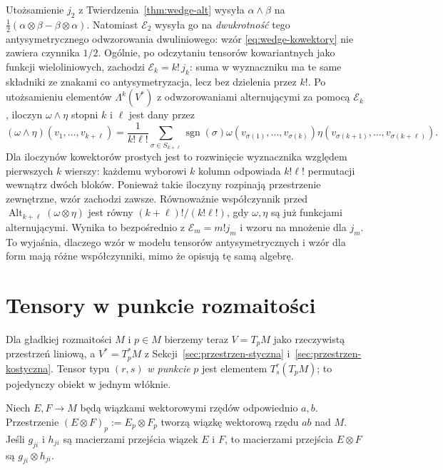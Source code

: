 \begin{uwaga}
Utożsamienie $j_2$ z Twierdzenia~\ref{thm:wedge-alt} wysyła
$\alpha\wedge\beta$ na
$\tfrac12(\alpha\otimes\beta-\beta\otimes\alpha)$.
Natomiast $\mathcal E_2$ wysyła go na \emph{dwukrotność}
tego antysymetrycznego odwzorowania dwuliniowego: wzór
\eqref{eq:wedge-kowektory} nie zawiera czynnika $1/2$.
Ogólnie, po odczytaniu tensorów kowariantnych jako funkcji wieloliniowych,
zachodzi $\mathcal E_k=k!\,j_k$: suma w wyznaczniku ma te same
składniki ze znakami co antysymetryzacja, lecz bez dzielenia przez $k!$.
Po utożsamieniu elementów $\Lambda^k(V^*)$ z
odwzorowaniami alternującymi za pomocą $\mathcal E_k$, iloczyn
$\omega\wedge\eta$ stopni $k$ i $\ell$ jest dany przez
\begin{equation}\label{eq:wedge-alt-forms}
 (\omega\wedge\eta)(v_1,\ldots,v_{k+\ell})
 =\frac1{k!\ell!}\sum_{\sigma\in S_{k+\ell}}
 \operatorname{sgn}(\sigma)
 \omega(v_{\sigma(1)},\ldots,v_{\sigma(k)})
 \eta(v_{\sigma(k+1)},\ldots,v_{\sigma(k+\ell)}).
\end{equation}
Dla iloczynów kowektorów prostych jest to rozwinięcie
wyznacznika względem pierwszych $k$ wierszy: każdemu
wyborowi $k$ kolumn odpowiada $k!\ell!$ permutacji
wewnątrz dwóch bloków. Ponieważ takie iloczyny rozpinają
przestrzenie zewnętrzne, wzór zachodzi zawsze.
Równoważnie współczynnik przed
$\operatorname{Alt}_{k+\ell}(\omega\otimes\eta)$ jest równy
$(k+\ell)!/(k!\ell!)$, gdy $\omega,\eta$ są już funkcjami
alternującymi. Wynika to bezpośrednio z
$\mathcal E_m=m!j_m$ i wzoru na mnożenie dla $j_m$.
To wyjaśnia, dlaczego wzór w modelu tensorów antysymetrycznych
i wzór dla form mają różne współczynniki, mimo że opisują tę samą algebrę.
\end{uwaga}

\section{Tensory w punkcie rozmaitości}
\label{sec:tensory-rozmaitosc}

Dla gładkiej rozmaitości $M$ i $p\in M$ bierzemy teraz
$V=T_pM$ jako rzeczywistą przestrzeń liniową, a
$V^*=T_p^*M$ z Sekcji~\ref{sec:przestrzen-styczna}
i~\ref{sec:przestrzen-kostyczna}. Tensor typu $(r,s)$
\emph{w punkcie} $p$ jest elementem $T^r_s(T_pM)$;
to pojedynczy obiekt w jednym włóknie.

\begin{stwierdzenie}
\label{prop:tensor-wiazek}
Niech $E,F\to M$ będą wiązkami wektorowymi rzędów
odpowiednio $a,b$. Przestrzenie $(E\otimes F)_p:=E_p\otimes F_p$
tworzą wiązkę wektorową rzędu $ab$ nad $M$. Jeśli
$g_{ji}$ i $h_{ji}$ są macierzami przejścia wiązek
$E$ i $F$, to macierzami przejścia $E\otimes F$
są $g_{ji}\otimes h_{ji}$.
\end{stwierdzenie}

